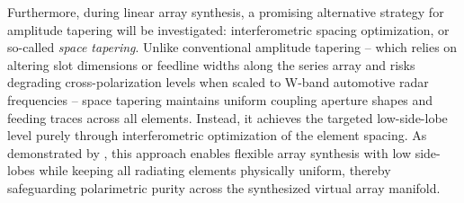 Furthermore, during linear array synthesis, a promising alternative strategy for amplitude tapering will be investigated: interferometric spacing optimization, or so-called \emph{space tapering}.
Unlike conventional amplitude tapering -- which relies on altering slot dimensions or feedline widths along the series array and risks degrading cross-polarization levels when scaled to W-band automotive radar frequencies -- space tapering maintains uniform coupling aperture shapes and feeding traces across all elements.
Instead, it achieves the targeted low-side-lobe level purely through interferometric optimization of the element spacing.
As demonstrated by \textcite{aslanSynthesisMultipleBeam2018}, this approach enables flexible array synthesis with low side-lobes while keeping all radiating elements physically uniform, thereby safeguarding polarimetric purity across the synthesized virtual array manifold.
